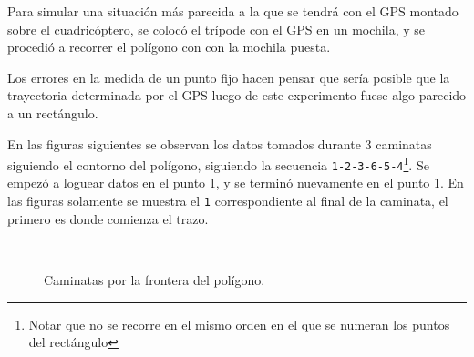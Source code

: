 \documentclass[spanish,12pt,a4paper,titlepage]{report}
\begin{document}
Para simular una situación más parecida a la que se tendrá con el GPS montado sobre el cuadricóptero, se colocó el trípode con el GPS en un mochila, y se procedió a recorrer el polígono con con la mochila puesta.

Los errores en la medida de un punto fijo hacen pensar que sería posible que la trayectoria determinada por el GPS luego de este experimento fuese algo parecido a un rectángulo.

En las figuras siguientes se observan los datos tomados durante 3 caminatas siguiendo el contorno del polígono, siguiendo la secuencia \verb+1-2-3-6-5-4+\footnote{Notar que no se recorre en el mismo orden en el que se numeran los puntos del rectángulo}. Se empezó a loguear datos en el punto 1, y se terminó nuevamente en el punto 1. En las figuras solamente se muestra el \verb+1+ correspondiente al final de la caminata, el primero es donde comienza el trazo.

\begin{figure} [h!]
  \centering
\\
  \caption{Caminatas por la frontera del polígono.}
  \label{fig:caminatas}
\end{figure}
\end{document}
